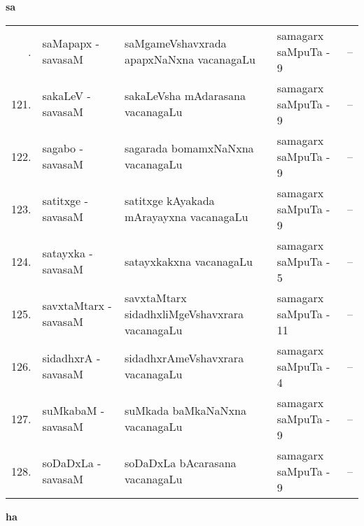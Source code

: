 \centerline{\bf sa}

{\renewcommand{\arraystretch}{1.3}
\begin{longtable}{rl>{\raggedright}p{5.5cm}lc}
\endfirsthead
\endhead
\endfoot
\endlastfoot
120. & saMapapx - savasaM &  saMgameVshavxrada apapxNaNxna vacanagaLu & samagarx saMpuTa - 9 & --\\
121. & sakaLeV - savasaM & sakaLeVsha mAdarasana vacanagaLu & samagarx saMpuTa - 9 & --\\
122. & sagabo - savasaM & sagarada bomamxNaNxna vacanagaLu & samagarx saMpuTa - 9 & --\\
123. & satitxge - savasaM & satitxge kAyakada mArayayxna vacanagaLu & samagarx saMpuTa - 9 & --\\
124. & satayxka - savasaM & satayxkakxna vacanagaLu & samagarx saMpuTa - 5 & --\\
125. & savxtaMtarx - savasaM &  savxtaMtarx sidadhxliMgeVshavxrara vacanagaLu & samagarx saMpuTa - 11 & --\\
126. & sidadhxrA - savasaM & sidadhxrAmeVshavxrara vacanagaLu & samagarx saMpuTa - 4 & --\\
127. & suMkabaM - savasaM & suMkada baMkaNaNxna vacanagaLu & samagarx saMpuTa - 9 & --\\
128. & soDaDxLa - savasaM &  soDaDxLa bAcarasana vacanagaLu & samagarx saMpuTa - 9 & --\\
\end{longtable}}
\smallskip

\centerline{\bf ha}

